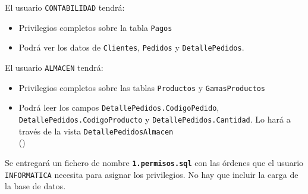 \begin{homeworkProblem}
  \begin{homeworkProblem2}
    El usuario \texttt{CONTABILIDAD} tendrá:
    \begin{itemize}
    \item Privilegios completos sobre la tabla \texttt{Pagos}
    \item Podrá ver  los datos de \texttt{Clientes}, \texttt{Pedidos} y \texttt{DetallePedidos}.
    \end{itemize}
  \end{homeworkProblem2}

  \begin{homeworkProblem2}
    El usuario \texttt{ALMACEN} tendrá:
    \begin{itemize}
    \item Privilegios completos sobre las tablas \texttt{Productos} y \texttt{GamasProductos}
    \item Podrá leer los campos \texttt{DetallePedidos.CodigoPedido}, \texttt{DetallePedidos.CodigoProducto} y \texttt{DetallePedidos.Cantidad}. Lo hará a través de la vista \texttt{DetallePedidosAlmacen} \\ ()
    \end{itemize}
  \end{homeworkProblem2}

  
  \begin{Aviso}
    Se entregará un fichero de nombre \textbf{\texttt{1.permisos.sql}} con las órdenes que el usuario \texttt{INFORMATICA} necesita para asignar los privilegios. No hay que incluir la carga de la base de datos.
  \end{Aviso}

\end{homeworkProblem}
